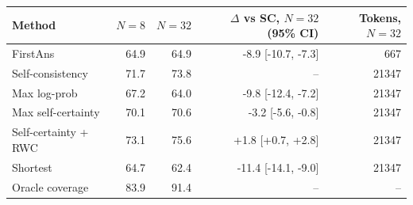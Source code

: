 \begin{tabular}{lrrrr}
\toprule
Method & $N{=}8$ & $N{=}32$ & $\Delta$ vs SC, $N{=}32$ (95\% CI) & Tokens, $N{=}32$ \\
\midrule
FirstAns & 64.9 & 64.9 & -8.9 [-10.7, -7.3] & 667 \\
Self-consistency & 71.7 & 73.8 & -- & 21347 \\
Max log-prob & 67.2 & 64.0 & -9.8 [-12.4, -7.2] & 21347 \\
Max self-certainty & 70.1 & 70.6 & -3.2 [-5.6, -0.8] & 21347 \\
Self-certainty + RWC & 73.1 & 75.6 & +1.8 [+0.7, +2.8] & 21347 \\
Shortest & 64.7 & 62.4 & -11.4 [-14.1, -9.0] & 21347 \\
\midrule
Oracle coverage & 83.9 & 91.4 & -- & -- \\
\bottomrule
\end{tabular}
